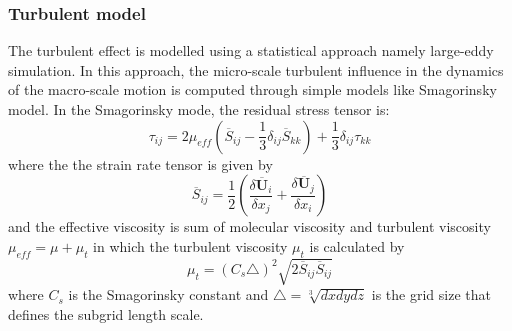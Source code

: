 \documentclass[preprint,12pt]{elsarticle}
\begin{document}
\subsubsection{Turbulent model}
The turbulent effect is modelled using a statistical approach namely large-eddy simulation. In this approach, the micro-scale turbulent influence in the dynamics of the macro-scale motion is computed through simple models like Smagorinsky model. In the Smagorinsky mode, the residual stress tensor is:
%
\begin{equation}
     \tau_{ij} = 2 \mu_{eff} (\overline{S}_{ij} - \frac{1}{3} \delta_{ij} \overline{S}_{kk}) + \frac{1}{3} \delta_{ij} \tau_{kk}
\end {equation}
%
%
where the the strain rate tensor is given by
%
\begin{equation}
     \overline{S}_{ij} = \frac{1}{2} (\frac{\delta \overline{\pmb{U}}_i}{\delta x_j} + \frac{\delta \overline{\pmb{U}}_j}{\delta x_i})
\end {equation}
%
%
and the effective viscosity is sum of molecular viscosity and turbulent viscosity $\mu_{eff} = \mu + \mu_t$ in which the turbulent viscosity $\mu_t$ is calculated by
%
\begin{equation}
    \mu_t = (C_s \triangle)^2 \sqrt{2 \overline{S}_{ij} \overline{S}_{ij}}
\end {equation}
%
%
where $C_s$ is the Smagorinsky constant and $\triangle = \sqrt[3]{dx dy dz}$ is the grid size that defines the subgrid length scale.
\end{document}
